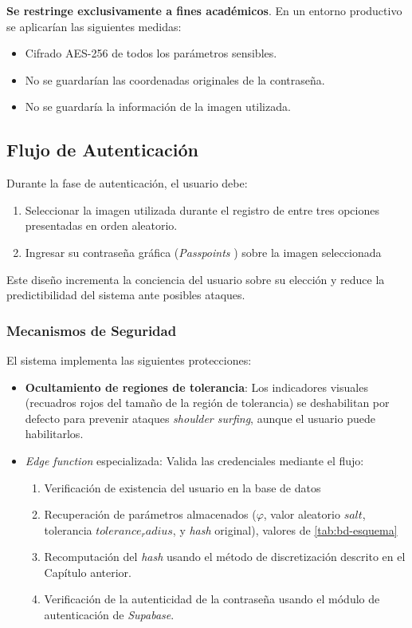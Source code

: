 \textbf{Se restringe exclusivamente a fines académicos}. En un entorno productivo se aplicarían las siguientes medidas:
\begin{itemize}
	\item Cifrado AES-256 de todos los parámetros sensibles.
	\item No se guardar\'ian las coordenadas originales de la contrase\~na.
	\item No se guardar\'ia la informaci\'on de la imagen utilizada.
\end{itemize}

\subsection{Flujo de Autenticación}
Durante la fase de autenticación, el usuario debe:

\begin{enumerate}
	\item Seleccionar la imagen utilizada durante el registro de entre tres opciones presentadas en orden aleatorio.
	\item Ingresar su contraseña gráfica (\textit{Passpoints
}) sobre la imagen seleccionada
\end{enumerate}

Este diseño incrementa la conciencia del usuario sobre su elección y reduce la predictibilidad del sistema ante posibles ataques.

\subsubsection{Mecanismos de Seguridad}
El sistema implementa las siguientes protecciones:

\begin{itemize}
	\item \textbf{Ocultamiento de regiones de tolerancia}: Los indicadores visuales (recuadros rojos del tama\~no de la regi\'on de tolerancia) se deshabilitan por defecto para prevenir ataques \textit{shoulder surfing}, aunque el usuario puede habilitarlos.
	\item \textit{Edge function} especializada: Valida las credenciales mediante el flujo:
	\begin{enumerate}
		\item Verificación de existencia del usuario en la base de datos
		\item Recuperación de parámetros almacenados ($\varphi$, valor aleatorio $salt$, tolerancia $tolerance_radius$, y \textit{hash} original), valores de \ref{tab:bd-esquema}
		\item Recomputación del \textit{hash} usando el método de discretización descrito en el Capítulo anterior.
		\item Verificaci\'on de la autenticidad de la contrase\~na usando el m\'odulo de autenticaci\'on de \textit{Supabase}.
	\end{enumerate}
\end{itemize}

